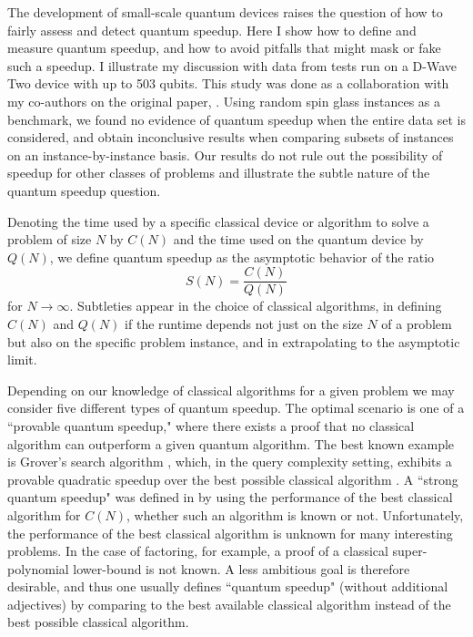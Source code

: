 
The development of small-scale quantum devices raises the question of how to fairly assess and detect quantum speedup. Here I show how to define and measure quantum speedup, and how to avoid pitfalls that might mask or fake such a speedup. I illustrate my discussion with data from tests run on a D-Wave Two device with up to 503 qubits. This study was done as a collaboration with my co-authors on the original paper, \cite{speedup}.
Using random spin glass instances as a benchmark, we found no evidence of quantum speedup when the entire data set is considered, and obtain inconclusive results when comparing subsets of instances on an instance-by-instance basis. Our results do not rule out the possibility of speedup for other classes of problems and illustrate
the subtle nature of the quantum speedup question.



Denoting the time used by a specific classical device or algorithm to solve a problem of size $N$ by $C(N)$ and the time used on the quantum device by $Q(N)$, we  define quantum speedup as the asymptotic behavior of the ratio
\begin{equation}
S(N)=\frac{C(N)}{Q(N)}
\end{equation}
for $N\rightarrow\infty$. Subtleties appear in the choice of classical algorithms, in defining $C(N)$ and $Q(N)$ if the runtime depends not just on the size $N$ of a problem but also on the specific problem instance, and in extrapolating to the asymptotic limit.

Depending on our knowledge of classical algorithms for a given problem we may consider five different types of quantum speedup. The optimal scenario is one of a ``provable quantum speedup," where there exists a proof that no classical algorithm can outperform a given quantum algorithm. The best known example is Grover's search algorithm \cite{Grover:97a},
which, in the query complexity setting, exhibits a provable quadratic speedup over the best possible classical algorithm \cite{Bennett:1997lh}.
A ``strong quantum speedup" was defined in \cite{Traub2013} by using the performance of the {best} classical algorithm for $C(N)$, whether such an algorithm is known or not. Unfortunately, the performance of the best classical algorithm is unknown for many interesting problems. In the case of factoring, for example, a proof of a classical super-polynomial lower-bound is not known. A less ambitious goal is therefore desirable, and thus one usually defines ``quantum speedup" (without additional adjectives) by comparing to the best available classical algorithm instead of the best possible classical algorithm.

